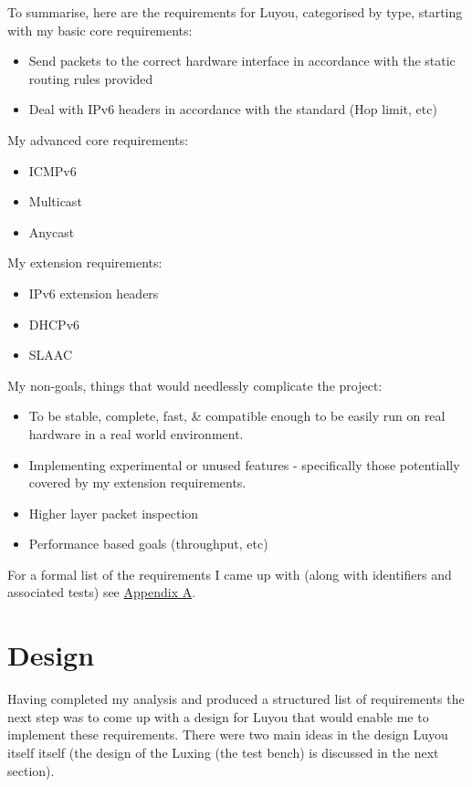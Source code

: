 \documentclass[12pt,a4paper,twoside,openright]{report}
\begin{document}
\bigskip

To summarise, here are the requirements for Luyou, categorised by type, starting with my basic core requirements:
\begin{itemize}
\item Send packets to the correct hardware interface in accordance with the static routing rules provided
\item Deal with IPv6 headers in accordance with the standard (Hop limit, etc)
\end{itemize}
My advanced core requirements:
\begin{itemize}
\item ICMPv6
\item Multicast
\item Anycast
\end{itemize}
My extension requirements:
\begin{itemize}
\item IPv6 extension headers
\item DHCPv6
\item SLAAC
\end{itemize}
My non-goals, things that would needlessly complicate the project:
\begin{itemize}
\item To be stable, complete, fast, \& compatible enough to be easily run on real hardware in a real world environment.
\item Implementing experimental or unused features - specifically those potentially covered by my extension requirements.
\item Higher layer packet inspection
\item Performance based goals (throughput, etc)
\end{itemize}
For a formal list of the requirements I came up with (along with identifiers and associated tests) see \hyperref[appendix::requirements]{Appendix A}.

\section{Design}
\label{sec::design}

Having completed my analysis and produced a structured list of requirements the next step was to come up with a design for Luyou that would enable me to implement these requirements.  There were two main ideas in the design Luyou itself itself (the design of the Luxing (the test bench) is discussed in the next section). 
\end{document}
